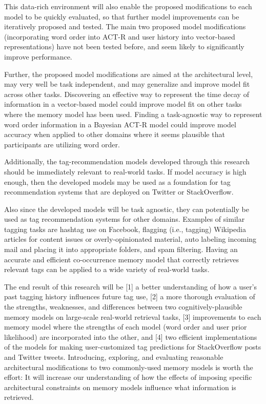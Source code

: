 \documentclass[man,floatsintext,donotrepeattitle]{apa6}
\begin{document}
This data-rich environment will also enable the proposed modifications to each model to be quickly evaluated, so that further model improvements can be iteratively proposed and tested.
The main two proposed model modifications (incorporating word order into ACT-R and user history into vector-based representations) have not been tested before, and seem likely to significantly improve performance.

Further, the proposed model modifications are aimed at the architectural level, may very well be task independent, and may generalize and improve model fit across other tasks.
Discovering an effective way to represent the time decay of information in a vector-based model could improve model fit on other tasks where the memory model has been used. 
Finding a task-agnostic way to represent word order information in a Bayesian ACT-R model could improve model accuracy when applied to other domains where it seems plausible that participants are utilizing word order.

Additionally, the tag-recommendation models developed through this research should be immediately relevant to real-world tasks.
If model accuracy is high enough, then the developed models may be used as a foundation for tag recommendation systems that are deployed on Twitter or StackOverflow.

Also since the developed models will be task agnostic, they can potentially be used as tag recommendation systems for other domains.
Examples of similar tagging tasks are hashtag use on Facebook, flagging (i.e., tagging) Wikipedia articles for content issues or overly-opinionated material,
auto labeling incoming mail and placing it into appropriate folders, and spam filtering.
Having an accurate and efficient co-occurrence memory model that correctly retrieves relevant tags can be applied to a wide variety of real-world tasks.

The end result of this research will be [1] a better understanding of how a user's past tagging history influences future tag use,
[2] a more thorough evaluation of the strengths, weaknesses, and differences between two cognitively-plausible memory models on large-scale real-world retrieval tasks,
[3] improvements to each memory model where the strengths of each model (word order and user prior likelihood) are incorporated into the other,
and [4] two efficient implementations of the models for making user-customized tag predictions for StackOverflow posts and Twitter tweets. 
Introducing, exploring, and evaluating reasonable architectural modifications to two commonly-used memory models is worth the effort:
It will increase our understanding of how the effects of imposing specific architectural constraints on memory models influence what information is retrieved.

\begingroup
{}
\setlength\bibitemsep{12pt}
\clearpage
\printbibliography[heading=bibintoc]
\endgroup
\end{document}
